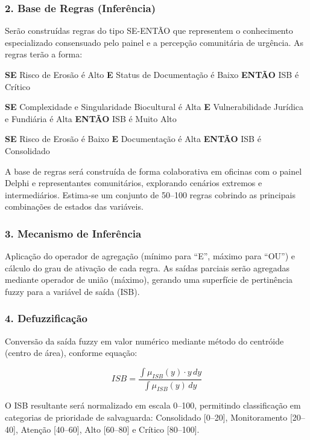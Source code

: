 \subsubsection{2. Base de Regras (Inferência)}

Serão construídas regras do tipo SE-ENTÃO que representem o conhecimento especializado consensuado pelo painel e a percepção comunitária de urgência. As regras terão a forma:

\textbf{SE} Risco de Erosão é Alto \textbf{E} Status de Documentação é Baixo \textbf{ENTÃO} ISB é Crítico

\textbf{SE} Complexidade e Singularidade Biocultural é Alta \textbf{E} Vulnerabilidade Jurídica e Fundiária é Alta \textbf{ENTÃO} ISB é Muito Alto

\textbf{SE} Risco de Erosão é Baixo \textbf{E} Documentação é Alta \textbf{ENTÃO} ISB é Consolidado

A base de regras será construída de forma colaborativa em oficinas com o painel Delphi e representantes comunitários, explorando cenários extremos e intermediários. Estima-se um conjunto de 50--100 regras cobrindo as principais combinações de estados das variáveis.

\subsubsection{3. Mecanismo de Inferência}

Aplicação do operador de agregação (mínimo para ``E'', máximo para ``OU'') e cálculo do grau de ativação de cada regra. As saídas parciais serão agregadas mediante operador de união (máximo), gerando uma superfície de pertinência fuzzy para a variável de saída (ISB).

\subsubsection{4. Defuzzificação}

Conversão da saída fuzzy em valor numérico mediante método do centróide (centro de área), conforme equação:

\begin{equation}
ISB = \frac{\int \mu_{ISB}(y) \cdot y \, dy}{\int \mu_{ISB}(y) \, dy}
\end{equation}

O ISB resultante será normalizado em escala 0--100, permitindo classificação em categorias de prioridade de salvaguarda: Consolidado [0--20], Monitoramento [20--40], Atenção [40--60], Alto [60--80] e Crítico [80--100].

